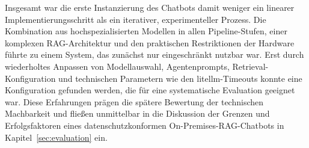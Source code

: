 Insgesamt war die erste Instanzierung des Chatbots damit weniger ein linearer Implementierungsschritt als ein iterativer, experimenteller Prozess.
Die Kombination aus hochspezialisierten Modellen in allen Pipeline-Stufen, einer komplexen RAG-Architektur und den praktischen Restriktionen der Hardware führte zu einem System, das zunächst nur eingeschränkt nutzbar war.
Erst durch wiederholtes Anpassen von Modellauswahl, Agentenprompts, Retrieval-Konfiguration und technischen Parametern wie den litellm-Timeouts konnte eine Konfiguration gefunden werden, die für eine systematische Evaluation geeignet war.
Diese Erfahrungen prägen die spätere Bewertung der technischen Machbarkeit und fließen unmittelbar in die Diskussion der Grenzen und Erfolgsfaktoren eines datenschutzkonformen On-Premises-RAG-Chatbots in Kapitel~\ref{sec:evaluation} ein.
